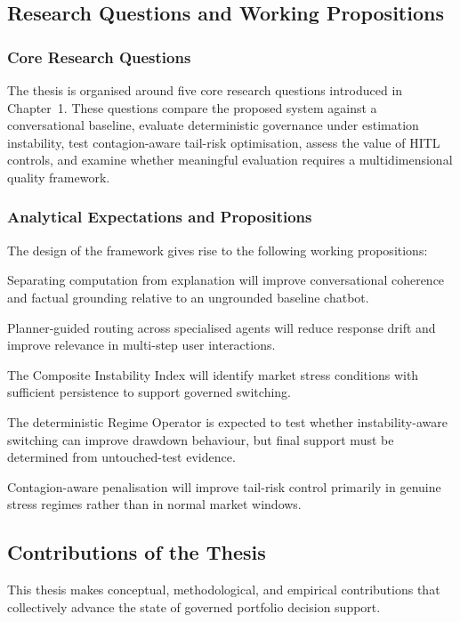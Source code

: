 \documentclass[11pt]{article}
\begin{document}
\subsection{Research Questions and Working Propositions}
\subsubsection{Core Research Questions}
The thesis is organised around five core research questions introduced in Chapter~1. These questions compare the proposed system against a conversational baseline, evaluate deterministic governance under estimation instability, test contagion-aware tail-risk optimisation, assess the value of HITL controls, and examine whether meaningful evaluation requires a multidimensional quality framework.

\subsubsection{Analytical Expectations and Propositions}
The design of the framework gives rise to the following working propositions:
\begin{description}[leftmargin=1cm]
  \item[\textbf{P1.}] Separating computation from explanation will improve conversational coherence and factual grounding relative to an ungrounded baseline chatbot.
  \item[\textbf{P2.}] Planner-guided routing across specialised agents will reduce response drift and improve relevance in multi-step user interactions.
  \item[\textbf{P3.}] The Composite Instability Index will identify market stress conditions with sufficient persistence to support governed switching.
  \item[\textbf{P4.}] The deterministic Regime Operator is expected to test whether instability-aware switching can improve drawdown behaviour, but final support must be determined from untouched-test evidence.
  \item[\textbf{P5.}] Contagion-aware penalisation will improve tail-risk control primarily in genuine stress regimes rather than in normal market windows.
\end{description}

\subsection{Contributions of the Thesis}
This thesis makes conceptual, methodological, and empirical contributions that collectively advance the state of governed portfolio decision support.
\end{document}
